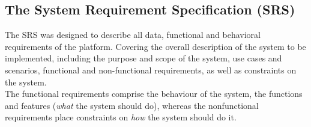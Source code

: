 

\subsection{The System Requirement Specification (SRS)}

The SRS was designed to describe all data, functional and behavioral requirements of the platform. Covering the overall description of the system to be implemented, including the purpose and scope of the system, use cases and scenarios, functional and non-functional requirements, as well as constraints on the system.\\

The functional requirements comprise the behaviour of the system, the functions and features (\textit{what} the system should do), whereas the nonfunctional requirements place constraints on \textit{how} the system should do it.

